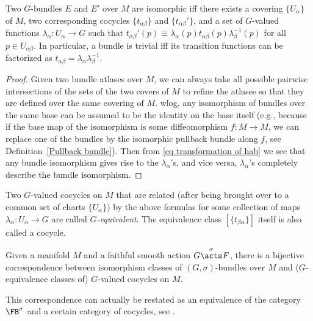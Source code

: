 \begin{thm}\label{bundle isomorphism thm}
Two $G$-bundles $E$ and $E'$ over $M$ are isomorphic iff there exists a covering $\{U_\alpha \}$ of $M$, two corresponding cocycles $\{t_{\alpha\beta}\}$ and $\{t_{\alpha\beta}'\}$, and a set of $G$-valued functions $\lambda_\alpha:U_\alpha\to G$ such that $t_{\alpha\beta}'(p)\equiv \lambda_\alpha (p) t_{\alpha\beta}(p) \lambda_\beta^{-1}(p)$ for all $p\in U_{\alpha\beta}$. In particular, a bundle is trivial iff its transition functions can be factorized as $t_{\alpha\beta}=\lambda_\alpha \lambda_\beta^{-1}$.
\end{thm}
\begin{proof}
Given two bundle atlases over $M$, we can always take all possible pairwise intersections of the sets of the two covers of $M$ to refine the atlases so that they are defined over the same covering of $M$. \gls{wlog}, any isomorphism of bundles over the same base can be assumed to be the identity on the base itself (e.g., because if the base map of the isomorphism is some diffeomorphism $f:M\to M$, we can replace one of the bundles by the isomorphic pullback bundle along $f$, see Definition~\ref{Pullback bundle}). Then from \eqref{eq transformation of hab} we see that any bundle isomorphism gives rise to the $\lambda_\alpha$'s, and vice versa, $\lambda_\alpha$'s completely describe the bundle isomorphism. 
\end{proof}
\begin{defn}
    Two $G$-valued cocycles on $M$ that are related (after being brought over to a common set of charts $\{U_\alpha\}$) by the above formulas for some collection of maps $\lambda_\alpha:U_\alpha\to G$ are called \emph{$G$-equivalent}. The equivalence class $[\{t_{\beta\alpha}\}]$ itself is also called a cocycle.
\end{defn}
\begin{cor}
    Given a manifold $M$ and a faithful smooth action $G\overset{\sigma}{\acts} F$, there is a bijective correspondence between isomorphism classes of $(G,\sigma)$-bundles over $M$ and ($G$-equivalence classes of) $G$-valued cocycles on $M$.
\end{cor}
This correspondence can actually be restated as an equivalence of the category $\FB^\sigma$ and a certain category of cocycles, see \cite{Vakar}.

